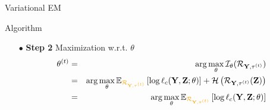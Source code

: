 \documentclass[compress,10pt]{beamer}
\begin{document}
\begin{frame}{Variational  EM}

\begin{block}{Algorithm}
\begin{enumerate}
 \item[$\bullet$]\textbf{Step 2} Maximization  w.r.t.  $\theta$
 \begin{eqnarray*}
 \theta^{(t)} &=& \arg \max_{\theta}   \mathcal{I}_{\theta}(\mathcal{R}_{\Xall,\btau^{(t)}}) \\
 &=&   \arg \max_{\theta} \mathbb{E}_{\color{dgreen}\mathcal{R}_{\Xall,\btau^{(t)}}} \left[\log \ell_c(\bX,\bZ;  \theta)   \right]  +   \mathcal{H}\left(\mathcal{R}_{\Xall,\btau^{(t)}}(\bZ)\right)\\
&=&  \arg \max_{\theta} \mathbb{E}_{\color{dgreen}\mathcal{R}_{\Xall,\btau^{(t)}}} \left[\log \ell_c(\bX,\bZ;  \theta)   \right]  
 \end{eqnarray*}
 
\end{enumerate}

 \end{block} 
 \end{frame}
\end{document}
